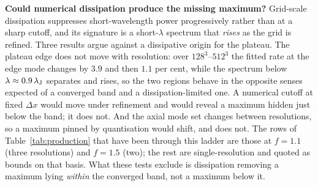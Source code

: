 \documentclass[usenatbib,twoside,twocolumn]{mnras}
\begin{document}
\smallskip\noindent\textbf{Could numerical dissipation produce the missing maximum?} Grid-scale dissipation suppresses short-wavelength power progressively rather than at a sharp cutoff, and its signature is a short-$\lambda$ spectrum that \emph{rises} as the grid is refined. Three results argue against a dissipative origin for the plateau. The plateau edge does not move with resolution: over $128^3$--$512^3$ the fitted rate at the edge mode changes by $3.9$ and then $1.1$ per cent, while the spectrum below $\lambda\approx0.9\,\lambda_{\rm J}$ separates and rises, so the two regions behave in the opposite senses expected of a converged band and a dissipation-limited one. A numerical cutoff at fixed $\Delta x$ would move under refinement and would reveal a maximum hidden just below the band; it does not. And the axial mode set changes between resolutions, so a maximum pinned by quantisation would shift, and does not. The rows of Table~\ref{tab:production} that have been through this ladder are those at $f=1.1$ (three resolutions) and $f=1.5$ (two); the rest are single-resolution and quoted as bounds on that basis. What these tests exclude is dissipation removing a maximum lying \emph{within} the converged band, not a maximum below it.
\end{document}
